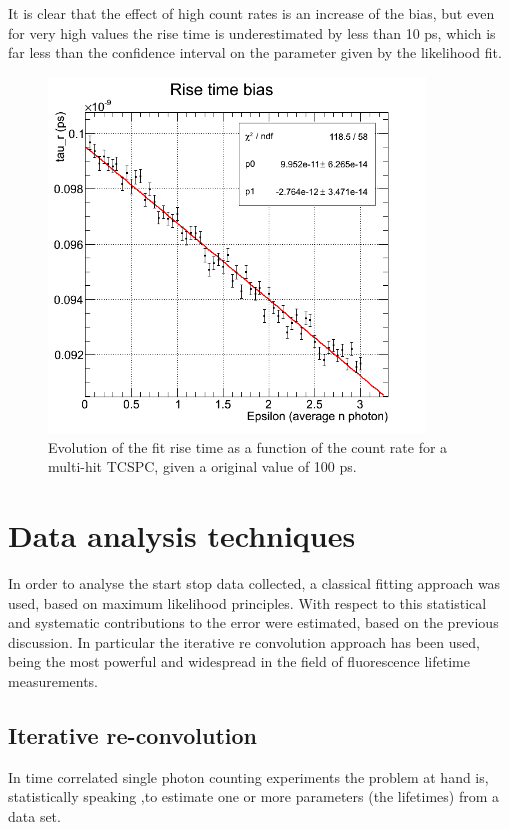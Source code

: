 It is clear that the effect of high count rates is an increase of the bias, but even for very high values the rise time is underestimated by less than 10 ps, which is far less than the confidence interval on the parameter given by the likelihood fit.
\begin{figure}[htbp]
\begin{center}
\includegraphics[width=10cm]{../Pictures/Chapter_6/bias_rise.png}
\end{center}
\caption[Rise time bias in multi hit TCSPC]{Evolution of the fit rise time as a function of the count rate for a multi-hit TCSPC, given a original value of 100 ps.}
\label{fig:bias_rise}
\end{figure}

\section{Data analysis techniques}
In order to analyse the start stop data collected, a classical fitting approach was used, based on maximum likelihood principles.
With respect to this statistical and systematic contributions to the error were estimated, based on the previous discussion.
In particular the iterative re convolution approach has been used, being the most powerful and widespread in the field of fluorescence lifetime measurements.

\subsection{Iterative re-convolution}
In time correlated single photon counting experiments the problem at hand is, statistically speaking ,to estimate one or more parameters (the lifetimes) from a data set.

